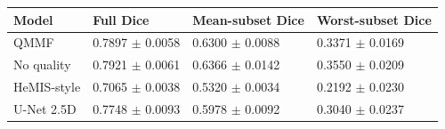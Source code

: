 \begin{tabular}{llll}
\toprule
Model & Full Dice & Mean-subset Dice & Worst-subset Dice \\
\midrule
QMMF & 0.7897 $\pm$ 0.0058 & 0.6300 $\pm$ 0.0088 & 0.3371 $\pm$ 0.0169 \\
No quality & 0.7921 $\pm$ 0.0061 & 0.6366 $\pm$ 0.0142 & 0.3550 $\pm$ 0.0209 \\
HeMIS-style & 0.7065 $\pm$ 0.0038 & 0.5320 $\pm$ 0.0034 & 0.2192 $\pm$ 0.0230 \\
U-Net 2.5D & 0.7748 $\pm$ 0.0093 & 0.5978 $\pm$ 0.0092 & 0.3040 $\pm$ 0.0237 \\
\bottomrule
\end{tabular}

